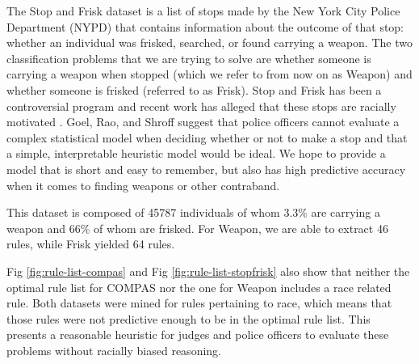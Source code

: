 The Stop and Frisk dataset is a list of stops made by the New York City Police Department (NYPD) that contains information about the outcome of that stop: whether an individual was frisked, searched, or found carrying a weapon.
The two classification problems that we are trying to solve are whether someone is carrying a weapon when stopped (which we refer to from now on as Weapon) and whether someone is frisked (referred to as Frisk).
Stop and Frisk has been a controversial program and recent work has alleged that these stops are racially motivated \cite{GoelRaSh16}.
Goel, Rao, and Shroff suggest that police officers cannot evaluate a complex statistical model when deciding whether or not to make a stop and that a simple, interpretable heuristic model would be ideal.
We hope to provide a model that is short and easy to remember, but also has high predictive accuracy when it comes to finding weapons or other contraband.

This dataset is composed of 45787 individuals of whom 3.3\% are carrying a weapon and 66\% of whom are frisked.
For Weapon, we are able to extract 46 rules, while Frisk yielded 64 rules.

Fig \ref{fig:rule-list-compas} and Fig \ref{fig:rule-list-stopfrisk} also show that neither the optimal rule list for COMPAS nor the one for Weapon includes a race related rule.
Both datasets were mined for rules pertaining to race, which means that those rules were not predictive enough to be in the optimal rule list.
This presents a reasonable heuristic for judges and police officers to evaluate these problems without racially biased reasoning.
